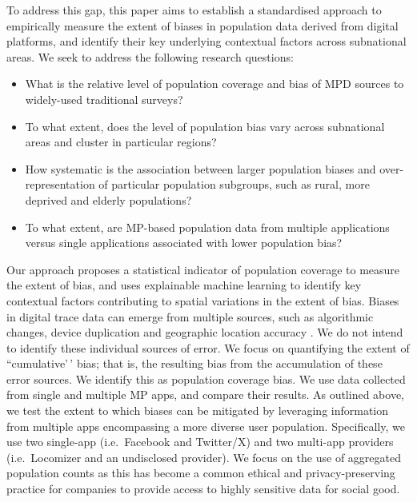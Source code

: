 \documentclass[]{rsos}%
\providecommand{\tightlist}{%
  \setlength{\itemsep}{0pt}\setlength{\parskip}{0pt}}
\begin{document}
To address this gap, this paper aims to establish a standardised
approach to empirically measure the extent of biases in population data
derived from digital platforms, and identify their key underlying
contextual factors across subnational areas. We seek to address the
following research questions:

\begin{itemize}
\tightlist
\item
  What is the relative level of population coverage and bias of MPD
  sources to widely-used traditional surveys?
\item
  To what extent, does the level of population bias vary across
  subnational areas and cluster in particular regions?
\item
  How systematic is the association between larger population biases
  and over-representation of particular population subgroups, such as
  rural, more deprived and elderly populations?
\item
  To what extent, are MP-based population data from multiple
  applications versus single applications associated with lower
  population bias?
\end{itemize}

Our approach proposes a statistical indicator of population coverage to
measure the extent of bias, and uses explainable machine learning to
identify key contextual factors contributing to spatial variations in
the extent of bias. Biases in digital trace data can emerge from
multiple sources, such as algorithmic changes, device duplication and
geographic location accuracy \citep{unstatsMPDMS2025}. We do not intend to
identify these individual sources of error. We focus on quantifying the
extent of ``cumulative'\,' bias; that is, the resulting bias from the
accumulation of these error sources. We identify this as population
coverage bias. We use data collected from single and multiple MP apps,
and compare their results. As outlined above, we test the extent to
which biases can be mitigated by leveraging information from multiple
apps encompassing a more diverse user population. Specifically, we use
two single-app (i.e.~Facebook and Twitter/X) and two multi-app providers
(i.e.~Locomizer and an undisclosed provider). We focus on the use of
aggregated population counts as this has become a common ethical and
privacy-preserving practice for companies to provide access to highly
sensitive data for social good.
\end{document}

